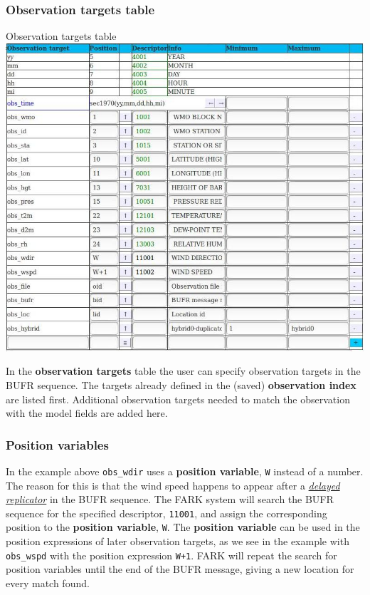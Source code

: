 \documentclass[letterpaper,10pt,twoside,twocolumn,openany]{book}
\begin{document}
\subsubsection{Observation targets table}
\begin{paperbox}{Observation targets table}
  \includegraphics[width=\columnwidth]{coloc_obs.jpg}
\end{paperbox}
In the {\bf observation targets} table the user can specify observation targets in the BUFR sequence.
The targets already defined in the (saved) {\bf observation index} are listed first. 
Additional observation targets needed to match the observation with the model fields are added here.

\subsubsection{Position variables}
In the example above \lstinline!obs_wdir! uses a {\bf position variable}, \lstinline!W! 
instead of a number. 
The reason for this is that the wind speed happens to appear after a \hyperlink{delayed}{\em delayed replicator} 
in the BUFR sequence.
The FARK system will search the BUFR sequence for the specified descriptor, \lstinline!11001!,
and assign the corresponding position to the {\bf position variable},  \lstinline!W!. 
The {\bf position variable} can be used in the position expressions of later observation targets,
as we see in the example with \lstinline!obs_wspd! with the position expression \lstinline!W+1!.
FARK will repeat the search for position variables until the end of the BUFR message, giving a new location for every match found.
\end{document}

